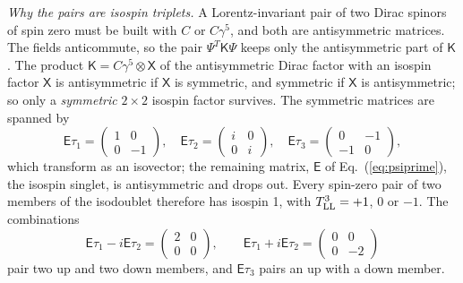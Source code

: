 \documentclass[aps,prd,twocolumn,superscriptaddress,nofootinbib,floatfix,longbibliography]{revtex4-2}
\newcommand{\LL}{{\rm LL}}
\begin{document}
\emph{Why the pairs are isospin triplets.} A Lorentz-invariant pair of two Dirac spinors of spin zero must be built with
$C$ or $C\gamma^5$, and both are antisymmetric matrices. The fields anticommute, so the pair $\Psi^T\mathsf K\Psi$ keeps only
the antisymmetric part of $\mathsf K$. The product $\mathsf K=C\gamma^5\otimes\mathsf X$ of the antisymmetric Dirac factor
with an isospin factor $\mathsf X$ is antisymmetric if $\mathsf X$ is symmetric, and symmetric if $\mathsf X$ is
antisymmetric; so only a \emph{symmetric} $2\times2$ isospin factor survives. The symmetric matrices are spanned by
\begin{equation}
\mathsf E\tau_1=\begin{pmatrix}1&0\\0&-1\end{pmatrix},\quad\mathsf E\tau_2=\begin{pmatrix}i&0\\0&i\end{pmatrix},\quad\mathsf E\tau_3=\begin{pmatrix}0&-1\\-1&0\end{pmatrix},
\label{eq:Etau}
\end{equation}
which transform as an isovector; the remaining matrix, $\mathsf E$ of Eq.~(\ref{eq:psiprime}), the isospin singlet, is
antisymmetric and drops out. Every spin-zero pair of two members of the isodoublet therefore has isospin 1, with
$T^3_\LL=+1$, $0$ or $-1$. The combinations
\begin{equation}
\mathsf E\tau_1-i\mathsf E\tau_2=\begin{pmatrix}2&0\\0&0\end{pmatrix},\qquad\mathsf E\tau_1+i\mathsf
E\tau_2=\begin{pmatrix}0&0\\0&-2\end{pmatrix}
\label{eq:Etaupm}
\end{equation}
pair two up and two down members, and $\mathsf E\tau_3$ pairs an up with a down member.
\end{document}
